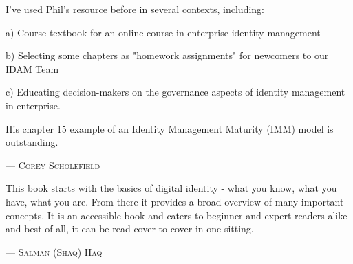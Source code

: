 I've used Phil's resource before in several contexts, including:

a) Course textbook for an online course in enterprise identity management

b) Selecting some chapters as "homework assignments" for newcomers to our IDAM Team

c) Educating decision-makers on the governance aspects of identity management in enterprise.

His chapter 15 example of an Identity Management Maturity (IMM) model is outstanding.
\setlength{\parindent}{0cm}\par\textsc{ --- Corey Scholefield }\par\vspace{12pt}\setlength{\parindent}{15pt}

This book starts with the basics of digital identity - what you know,
what you have, what you are. From there it provides a broad overview of many important
concepts. It is an accessible book and caters to beginner and expert readers alike and
best of all, it can be read cover to cover in one sitting.
\setlength{\parindent}{0cm}\par\textsc{ --- Salman (Shaq) Haq }\par\vspace{12pt}\setlength{\parindent}{15pt}
